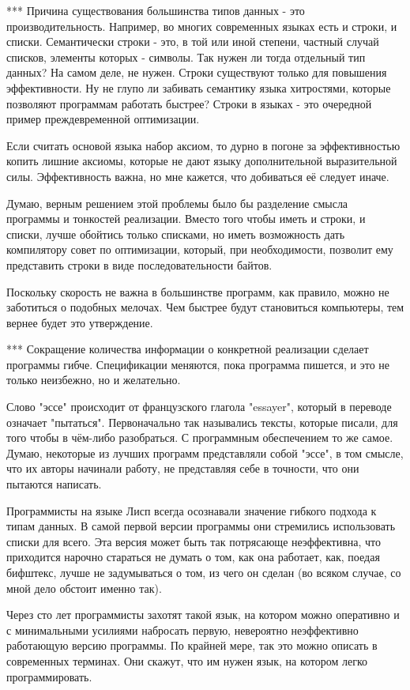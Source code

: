 \documentclass[ebook,12pt,oneside,openany]{memoir}
\begin{document}
*** Причина существования большинства типов данных - это
производительность. Например, во многих современных языках есть и
строки, и списки. Семантически строки - это, в той или иной степени,
частный случай списков, элементы которых - символы. Так нужен ли тогда
отдельный тип данных? На самом деле, не нужен. Строки существуют
только для повышения эффективности. Ну не глупо ли забивать семантику
языка хитростями, которые позволяют программам работать быстрее?
Строки в языках - это очередной пример преждевременной оптимизации.

Если считать основой языка набор аксиом, то дурно в погоне за
эффективностью копить лишние аксиомы, которые не дают языку
дополнительной выразительной силы. Эффективность важна, но мне
кажется, что добиваться её следует иначе.

Думаю, верным решением этой проблемы было бы разделение смысла
программы и тонкостей реализации. Вместо того чтобы иметь и строки, и
списки, лучше обойтись только списками, но иметь возможность дать
компилятору совет по оптимизации, который, при необходимости, позволит
ему представить строки в виде последовательности байтов.

Поскольку скорость не важна в большинстве программ, как правило, можно
не заботиться о подобных мелочах. Чем быстрее будут становиться
компьютеры, тем вернее будет это утверждение.

*** Сокращение количества информации о конкретной реализации сделает
программы гибче. Спецификации меняются, пока программа пишется, и это
не только неизбежно, но и желательно.

Слово "эссе" происходит от французского глагола "essayer", который в
переводе означает "пытаться". Первоначально так назывались тексты,
которые писали, для того чтобы в чём-либо разобраться. С программным
обеспечением то же самое. Думаю, некоторые из лучших программ
представляли собой "эссе", в том смысле, что их авторы начинали
работу, не представляя себе в точности, что они пытаются написать.

Программисты на языке Лисп всегда осознавали значение гибкого подхода
к типам данных. В самой первой версии программы они стремились
использовать списки для всего. Эта версия может быть так потрясающе
неэффективна, что приходится нарочно стараться не думать о том, как
она работает, как, поедая бифштекс, лучше не задумываться о том, из
чего он сделан (во всяком случае, со мной дело обстоит именно так).

Через сто лет программисты захотят такой язык, на котором можно
оперативно и с минимальными усилиями набросать первую, невероятно
неэффективно работающую версию программы. По крайней мере, так это
можно описать в современных терминах. Они скажут, что им нужен язык,
на котором легко программировать.
\end{document}

